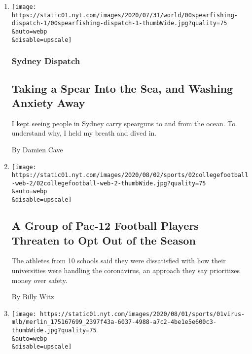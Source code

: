\begin{enumerate}
\def\labelenumi{\arabic{enumi}.}
\item
  \href{/2020/08/03/world/australia/spearfishing-sydney-coronavirus.html}{}

  \texttt{[image: https://static01.nyt.com/images/2020/07/31/world/00spearfishing-dispatch-1/00spearfishing-dispatch-1-thumbWide.jpg?quality=75\\\&auto=webp\\\&disable=upscale]}

  \hypertarget{sydney-dispatch}{%
  \subsubsection{Sydney Dispatch}\label{sydney-dispatch}}

  \hypertarget{taking-a-spear-into-the-sea-and-washing-anxiety-away}{%
  \subsection{Taking a Spear Into the Sea, and Washing Anxiety
  Away}\label{taking-a-spear-into-the-sea-and-washing-anxiety-away}}

  I kept seeing people in Sydney carry spearguns to and from the ocean.
  To understand why, I held my breath and dived in.

  By Damien Cave
\item
  \href{/2020/08/02/sports/ncaafootball/coronavirus-college-football-pac-12.html}{}

  \texttt{[image: https://static01.nyt.com/images/2020/08/02/sports/02collegefootball-web-2/02collegefootball-web-2-thumbWide.jpg?quality=75\\\&auto=webp\\\&disable=upscale]}

  \hypertarget{a-group-of-pac-12-football-players-threaten-to-opt-out-of-the-season}{%
  \subsection{A Group of Pac-12 Football Players Threaten to Opt Out of
  the
  Season}\label{a-group-of-pac-12-football-players-threaten-to-opt-out-of-the-season}}

  The athletes from 10 schools said they were dissatisfied with how
  their universities were handling the coronavirus, an approach they say
  prioritizes money over safety.

  By Billy Witz
\item
  \href{/2020/08/01/sports/baseball/coronavirus-cardinals.html}{}

  \texttt{[image: https://static01.nyt.com/images/2020/08/01/sports/01virus-mlb/merlin\_175167699\_2397f43a-6037-4988-a7c2-4be1e5e600c3-thumbWide.jpg?quality=75\\\&auto=webp\\\&disable=upscale]}


\end{enumerate}
